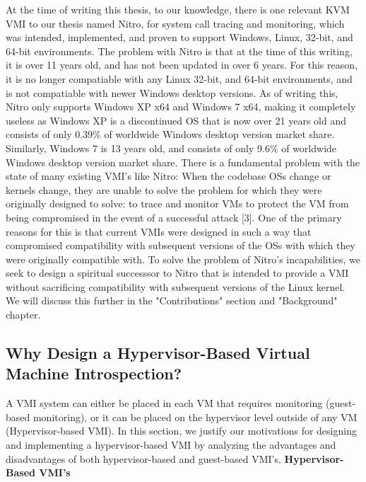 \documentclass{report}
\begin{document}
\begin{spacing}{1.5}
{\large
At the time of writing this thesis, to our knowledge, there is one relevant KVM VMI to our thesis named Nitro, for system call tracing and monitoring, which was intended, implemented, and proven to support Windows, Linux, 32-bit, and 64-bit environments. The problem with Nitro is that at the time of this writing, it is over 11 years old, and has not been updated in over 6 years. For this reason, it is no longer compatiable with any Linux 32-bit, and 64-bit environments, and is not compatiable with newer Windows desktop versions. As of writing this, Nitro only supports Windows XP x64 and Windows 7 x64, making it completely useless as Windows XP is a discontinued OS that is now over 21 years old and consists of only 0.39\% of worldwide Windows desktop version market share. Similarly, Windows 7 is 13 years old, and consists of only 9.6\% of worldwide Windows desktop version market share. There is a fundamental problem with the state of many existing VMI's like Nitro: When the codebase OSs change or kernels change, they are unable to solve the problem for which they were originally designed to solve: to trace and monitor VMs to protect the VM from being compromised in the event of a successful attack [3]. One of the primary reasons for this is that current VMIs were designed in such a way that compromised compatibility with subsequent versions of the OSs with which they were originally compatible with. To solve the problem of Nitro's incapabilities, we seek to design a spiritual successsor to Nitro that is intended to provide a VMI without sacrificing compatibility with subsequent versions of the Linux kernel. We will discuss this further in the "Contributions" section and "Background" chapter.
\newline
}












\subsection{Why Design a Hypervisor-Based Virtual Machine Introspection?}

{\large
A VMI system can either be placed in each VM that requires monitoring (guest-based monitoring), or it can be placed on the hypervisor level outside of any VM (Hypervisor-based VMI). In this section, we justify our motivations for designing and implementing a hypervisor-based VMI by analyzing the advantages and disadvantages of both hypervisor-based and guest-based VMI's. 
\newline \newline
\textbf{Hypervisor-Based VMI's}
\newline
}


\end{spacing}
\end{document}
